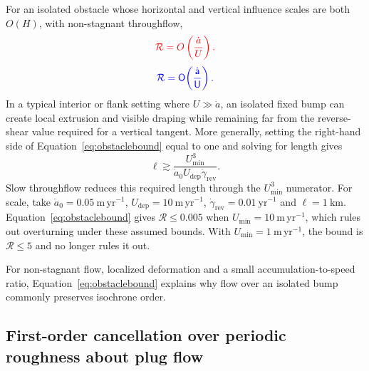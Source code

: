 \documentclass[review]{igs}
\providecommand{\DIFadd}[1]{{\protect\color{blue} \sf #1}} %
\providecommand{\DIFdel}[1]{{\protect\color{red} \scriptsize #1}} %
\providecommand{\DIFaddbegin}{} %
\providecommand{\DIFaddend}{} %
\providecommand{\DIFdelbegin}{} %
\providecommand{\DIFdelend}{} %
\newcommand{\DIFscaledelfig}{0.5}
\newlength{\DIFdelgraphicswidth} %
\newlength{\DIFdelgraphicsheight} %
\newcommand{\DIFaddincludegraphics}[2][]{{\color{blue}\fbox{\DIFOincludegraphics[#1]{#2}}}} %
\newcommand{\DIFdelincludegraphics}[2][]{%
\sbox{\DIFdelgraphicsbox}{\DIFOincludegraphics[#1]{#2}}%
\settoboxwidth{\DIFdelgraphicswidth}{\DIFdelgraphicsbox} %
\settoboxtotalheight{\DIFdelgraphicsheight}{\DIFdelgraphicsbox} %
\scalebox{\DIFscaledelfig}{%
\parbox[b]{\DIFdelgraphicswidth}{\usebox{\DIFdelgraphicsbox}\\[-\baselineskip] \rule{\DIFdelgraphicswidth}{0em}}\llap{\resizebox{\DIFdelgraphicswidth}{\DIFdelgraphicsheight}{%
\setlength{\unitlength}{\DIFdelgraphicswidth}%
\begin{picture}(1,1)%
\thicklines\linethickness{2pt} %
{\color[rgb]{1,0,0}\put(0,0){\framebox(1,1){}}}%
{\color[rgb]{1,0,0}\put(0,0){\line( 1,1){1}}}%
{\color[rgb]{1,0,0}\put(0,1){\line(1,-1){1}}}%
\end{picture}%
}\hspace*{3pt}}} %
} %
\DeclareRobustCommand{\DIFaddbegin}{\DIFOaddbegin \let\includegraphics\DIFaddincludegraphics} %
\DeclareRobustCommand{\DIFaddend}{\DIFOaddend \let\includegraphics\DIFOincludegraphics} %
\DeclareRobustCommand{\DIFdelbegin}{\DIFOdelbegin \let\includegraphics\DIFdelincludegraphics} %
\DeclareRobustCommand{\DIFdelend}{\DIFOaddend \let\includegraphics\DIFOincludegraphics} %
\begin{document}
For an isolated obstacle whose horizontal and vertical influence scales are both \(O(H)\), with non-stagnant throughflow,
\DIFdelbegin \begin{displaymath}
\DIFdel{\mathcal{R}=O\left(\frac{\dot a}{U}\right).
}\end{displaymath}%
\DIFdelend \DIFaddbegin \begin{equation}
\DIFadd{\mathcal{R}=O\!\left(\frac{\dot a}{U}\right).
\label{eq:isolatedscale}
}\end{equation}\DIFaddend 
In a typical interior or flank setting where \(U\gg\dot a\), an isolated fixed bump can create local extrusion and visible draping while remaining far from the reverse-shear value required for a vertical tangent. More generally, setting the right-hand side of Equation~\ref{eq:obstaclebound} equal to one and solving for length gives
\begin{equation}
\ell
\gtrsim
\frac{U_{\min}^{3}}{\dot a_0U_{\mathrm{dep}}\dot\gamma_{\mathrm{rev}}}.
\label{eq:lengththreshold}
\end{equation}
Slow throughflow reduces this required length through the \(U_{\min}^{3}\) numerator. For scale, take \(\dot a_0=0.05~\mathrm{m\,yr^{-1}}\), \(U_{\mathrm{dep}}=10~\mathrm{m\,yr^{-1}}\), \(\dot\gamma_{\mathrm{rev}}=0.01~\mathrm{yr^{-1}}\) and \(\ell=1~\mathrm{km}\). Equation~\ref{eq:obstaclebound} gives \(\mathcal{R}\leq0.005\) when \(U_{\min}=10~\mathrm{m\,yr^{-1}}\), which rules out overturning under these assumed bounds. With \(U_{\min}=1~\mathrm{m\,yr^{-1}}\), the bound is \(\mathcal{R}\leq5\) and no longer rules it out.

For non-stagnant flow, localized deformation and a small accumulation-to-speed ratio, Equation~\ref{eq:obstaclebound} explains why flow over an isolated bump commonly preserves isochrone order.

\subsection{First-order cancellation over periodic roughness about plug flow}
\end{document}
